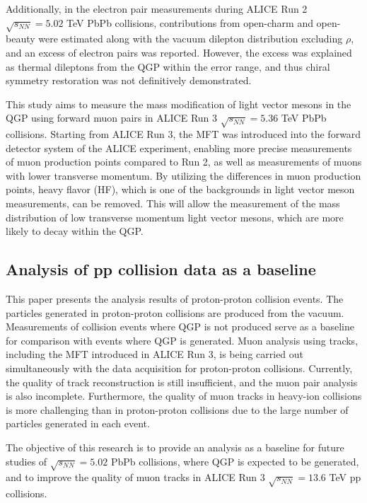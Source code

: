         Additionally, in the electron pair measurements during ALICE Run 2 $\sqrt{s_{NN}} = 5.02$ TeV PbPb collisions, contributions from open-charm and open-beauty were estimated along with the vacuum dilepton distribution excluding $\rho$, and an excess of electron pairs was reported. However, the excess was explained as thermal dileptons from the QGP within the error range, and thus chiral symmetry restoration was not definitively demonstrated\cite{ALICE:2023jef}.  
        
        This study aims to measure the mass modification of light vector mesons in the QGP using forward muon pairs in ALICE Run 3 $\sqrt{s_{NN}} = 5.36$ TeV PbPb collisions. Starting from ALICE Run 3, the MFT was introduced into the forward detector system of the ALICE experiment, enabling more precise measurements of muon production points compared to Run 2, as well as measurements of muons with lower transverse momentum. By utilizing the differences in muon production points, heavy flavor (HF), which is one of the backgrounds in light vector meson measurements, can be removed. This will allow the measurement of the mass distribution of low transverse momentum light vector mesons, which are more likely to decay within the QGP.
    \subsection{Analysis of pp collision data as a baseline}
        This paper presents the analysis results of proton-proton collision events. The particles generated in proton-proton collisions are produced from the vacuum. Measurements of collision events where QGP is not produced serve as a baseline for comparison with events where QGP is generated. Muon analysis using tracks, including the MFT introduced in ALICE Run 3, is being carried out simultaneously with the data acquisition for proton-proton collisions. Currently, the quality of track reconstruction is still insufficient, and the muon pair analysis is also incomplete. Furthermore, the quality of muon tracks in heavy-ion collisions is more challenging than in proton-proton collisions due to the large number of particles generated in each event.  

        The objective of this research is to provide an analysis as a baseline for future studies of $\sqrt{s_{NN}} = 5.02$ PbPb collisions, where QGP is expected to be generated, and to improve the quality of muon tracks in ALICE Run 3 $\sqrt{s_{NN}} = 13.6$ TeV pp collisions.